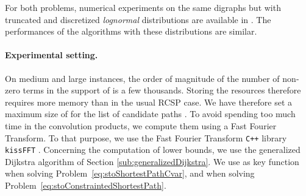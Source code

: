 \documentclass[11pt]{amsart}
\theoremstyle{plain}
\theoremstyle{remark}
\begin{document}
For both problems, numerical experiments on the same digraphs but with truncated and discretized \emph{lognormal} distributions are available in \cite{parmentier2016thesis}. The performances of the algorithms with these distributions are similar.




\paragraph{Experimental setting.} On medium and large instances, the order of magnitude of the number of non-zero terms in the support of  is a few thousands. Storing the resources therefore requires more memory than in the usual RCSP case. We have therefore set a maximum size of  for the list of candidate paths . To avoid spending too much time in the convolution products, we compute them using a Fast Fourier Transform. To that purpose, we use the Fast Fourier Transform \texttt{C++} library \texttt{kissFFT} \cite{kissFFT}. Concerning the computation of lower bounds, we use the generalized Dijkstra algorithm of Section \ref{sub:generalizedDijkstra}. We use  as key function  when solving Problem~\eqref{eq:stoShortestPathCvar}, and  when solving Problem~\eqref{eq:stoConstraintedShortestPath}.
\end{document}
